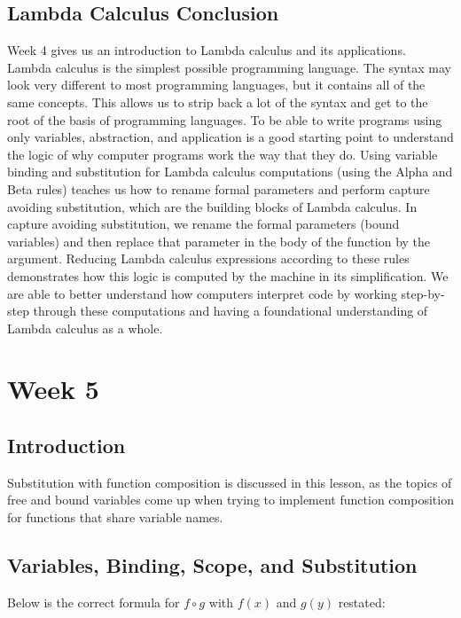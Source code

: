 \documentclass{article}
\theoremstyle{theorem}
\theoremstyle{definition}
\theoremstyle{remark}
\begin{document}
\subsection{Lambda Calculus Conclusion}

Week 4 gives us an introduction to Lambda calculus and its applications. Lambda calculus is the simplest possible programming language. The syntax may look very different to most programming languages, but it contains all of the same concepts. This allows us to strip back a lot of the syntax and get to the root of the basis of programming languages. To be able to write programs using only variables, abstraction, and application is a good starting point to understand the logic of why computer programs work the way that they do. Using variable binding and substitution for Lambda calculus computations (using the Alpha and Beta rules) teaches us how to rename formal parameters and perform capture avoiding substitution, which are the building blocks of Lambda calculus. In capture avoiding substitution, we rename the formal parameters (bound variables) and then replace that parameter in the body of the function by the argument. Reducing Lambda calculus expressions according to these rules demonstrates how this logic is computed by the machine in its simplification. We are able to better understand how computers interpret code by working step-by-step through these computations and having a foundational understanding of Lambda calculus as a whole. 

\section{Week 5}

\subsection{Introduction}

Substitution with function composition is discussed in this lesson, as the topics of free and bound variables come up when trying to implement function composition for functions that share variable names.

\subsection{Variables, Binding, Scope, and Substitution} 

Below is the correct formula for $f \circ g$ with $f(x)$ and $g(y)$ restated:
\end{document}
